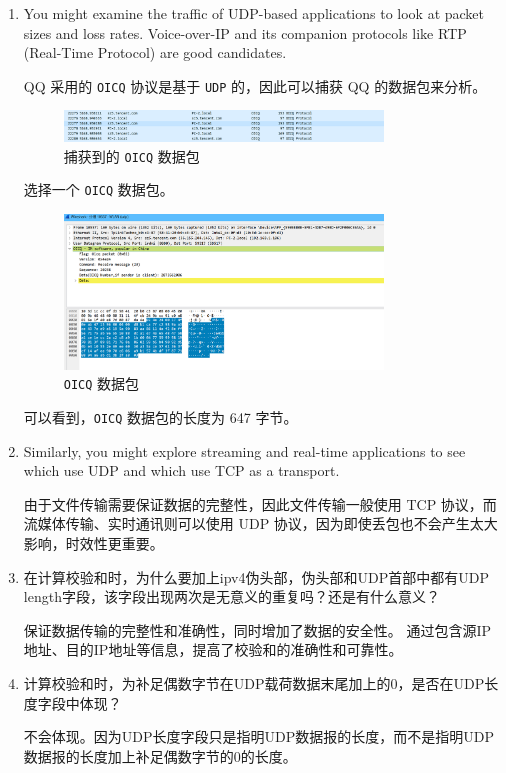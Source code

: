 \documentclass{article}
\begin{document}
\begin{enumerate}[noitemsep]
  \item You might examine the traffic of UDP-based applications to look at packet sizes and loss rates. Voice-over-IP and its companion protocols like RTP (Real-Time Protocol) are good candidates.

        QQ 采用的 \texttt{OICQ} 协议是基于 \texttt{UDP} 的，因此可以捕获 QQ 的数据包来分析。

        \begin{figure}[H]
          \centering
          \includegraphics[width=0.8\textwidth]{img/9.png}
          \caption{捕获到的 \texttt{OICQ} 数据包}
        \end{figure}

        选择一个 \texttt{OICQ} 数据包。

        \begin{figure}[H]
          \centering
          \includegraphics[width=0.8\textwidth]{img/10.png}
          \caption{\texttt{OICQ} 数据包}
        \end{figure}

        可以看到，\texttt{OICQ} 数据包的长度为 647 字节。

  \item Similarly, you might explore streaming and real-time applications to see which use UDP and which use TCP as a transport.
  
  由于文件传输需要保证数据的完整性，因此文件传输一般使用 TCP 协议，而流媒体传输、实时通讯则可以使用 UDP 协议，因为即使丢包也不会产生太大影响，时效性更重要。

  \item 在计算校验和时，为什么要加上ipv4伪头部，伪头部和UDP首部中都有UDP length字段，该字段出现两次是无意义的重复吗？还是有什么意义？
  
  保证数据传输的完整性和准确性，同时增加了数据的安全性。 通过包含源IP地址、目的IP地址等信息，提高了校验和的准确性和可靠性。

  \item 计算校验和时，为补足偶数字节在UDP载荷数据末尾加上的0，是否在UDP长度字段中体现？
  
  不会体现。因为UDP长度字段只是指明UDP数据报的长度，而不是指明UDP数据报的长度加上补足偶数字节的0的长度。

\end{enumerate}
\end{document}
